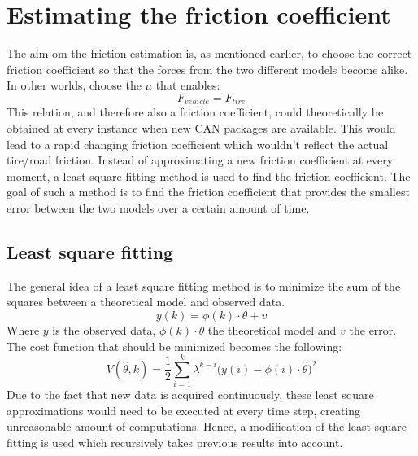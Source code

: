 
\section{Estimating the friction coefficient}
The aim om the friction estimation is, as mentioned earlier, to choose the correct friction coefficient so that the forces from the two different models become alike. In other worlds, choose the $ \mu $ that enables:
\begin{equation}
	F_{vehicle} = F_{tire}
\end{equation}
This relation, and therefore also a friction coefficient, could theoretically be obtained at every instance when new CAN packages are available. This would lead to a rapid changing friction coefficient which wouldn't reflect the actual tire/road friction. Instead of approximating a new friction coefficient at every moment, a least square fitting method is used to find the friction coefficient. The goal of such a method is to find the friction coefficient that provides the smallest error between the two models over a certain amount of time. 

\subsection{Least square fitting}
The general idea of a least square fitting method is to minimize the sum of the squares between a theoretical model and observed data. 
\begin{equation} 
	y(k) = \phi(k)\cdot\theta + v
	\label{eq:least_square}
\end{equation}
Where $ y $ is the observed data, $ \phi(k)\cdot\theta $ the theoretical model and $ v $ the error. The cost function that should be minimized becomes the following:
\begin{equation}
	V(\hat{\theta}, k) = \dfrac{1}{2} \sum_{i=1}^{k} \lambda^{k-i}\Big(y(i) - \phi(i)\cdot\hat\theta \Big)^2
\end{equation}
Due to the fact that new data is acquired continuously, these least square approximations would need to be executed at every time step, creating unreasonable amount of computations. Hence, a modification of the least square fitting is used which recursively takes previous results into account.

